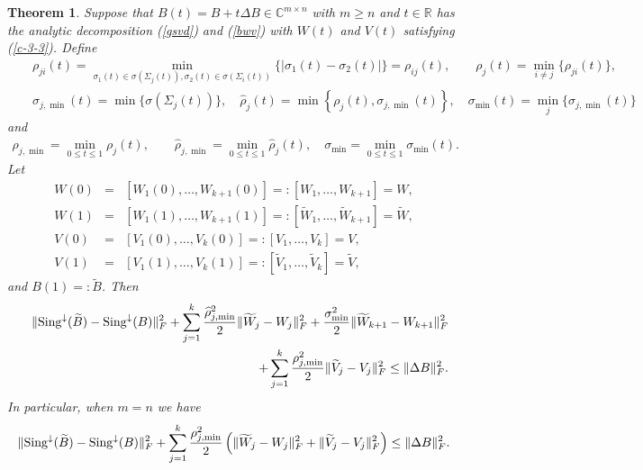 \documentclass[11pt,a4paper]{article}
\numberwithin{equation}{section}
\newcommand {\bstar}  {\begin{eqnarray*}}
\newcommand {\estar} {\end{eqnarray*}}
\newtheorem{Theorem}{Theorem}[section]
\newcommand {\wh} {\widehat}
\newcommand {\wt} {\widetilde}
\begin{document}
\begin{Theorem}\label{them31}
Suppose that $B(t)=B+t\Delta B\in\mathbb{C}^{m\times n}$ with $
m\geq n$ and $t\in\mathbb{R}$ has the analytic decomposition (\ref{gsvd}) and (\ref{bwv})
with $W(t)$ and $V(t)$ satisfying (\ref{c-3-3}). Define
\begin{eqnarray*}
&&\rho_{ji}(t)=\min_{\sigma_1(t)\in\sigma(\Sigma_j(t)),\sigma_2(t)\in\sigma(\Sigma_i(t))}\{\left|\sigma_1(t)-\sigma_2(t)\right|\}=\rho_{ij}(t),
\qquad \rho_{j}(t)=\min_{i\ne j}\{\rho_{ji}(t)\},\\
&&
\sigma_{j,\min}(t)=\min \{\sigma(\Sigma_j(t))\},\quad\wh \rho_{j}(t)=\min\left\{\rho_{j}(t),\sigma_{j,\min}(t)\right\},\quad
\sigma_{\min}(t)=\min_{j}\{\sigma_{j,\min}(t)\}
\end{eqnarray*}
and
\begin{eqnarray*}
\rho_{j,\min}=\min_{0\le t\le 1}\rho_j(t),\qquad\wh \rho_{j,\min}=
\min_{0\le t\le 1}\wh\rho_j(t),\quad
\sigma_{\min}=\min_{0\le t\le 1}\sigma_{\min}(t).
\end{eqnarray*}
Let
\bstar
W(0)&=&\left[W_1(0),\ldots, W_{k+1}(0)\right]=:\left[W_1,\ldots, W_{k+1}\right]=W,\\
W(1)&=&\left[W_1(1),\ldots,W_{k+1}(1)\right]=:[\wt W_1,\ldots,\wt W_{k+1}]
=\wt W,\\
V(0)&=&[V_1(0),\ldots, V_{k}(0)]=:[ V_1, \ldots,V_{k}]=V,\\
V(1)&=&[V_1(1),\ldots ,V_{k}(1)]=:[\wt V_1,\ldots,\wt V_{k}]=\wt V,%
\estar
and $B(1)=:\wt B$. Then
\begin{eqnarray}\label{c-3-4}
&&\|{{\rm Sing}^{\downarrow}(\wt B)-{\rm Sing}^{\downarrow}(B)}\|_F^2
+\sum_{j=1}^{k}\frac{\wh\rho_{j,\min}^2}2\|{\wt W_j-W_j}\|_F^2
+\frac{\sigma_{\min}^2}2\|{\wt W_{k+1}-W_{k+1}}\|_F^2\nonumber\\
&&\qquad\qquad\qquad\qquad\qquad\qquad\qquad\qquad\quad
+\sum_{j=1}^k\frac{\rho_{j,\min}^2}2\|{\wt V_j-V_j}\|_F^2
\leq\|{\Delta B}\|_F^2.
\end{eqnarray}
In particular, when $m=n$ we have
\begin{eqnarray}\label{c-3-4-1}
\|{{\rm Sing}^{\downarrow}(\wt B)-{\rm Sing}^{\downarrow}(B)}\|_F^2
+\sum_{j=1}^k\frac{\rho_{j,\min}^2}2\left(\|{\wt W_j-W_j}\|_F^2+\|{\wt V_j-V_j}\|_F^2\right)
\leq\|{\Delta B}\|_F^2.
\end{eqnarray}
\end{Theorem}
\end{document}
